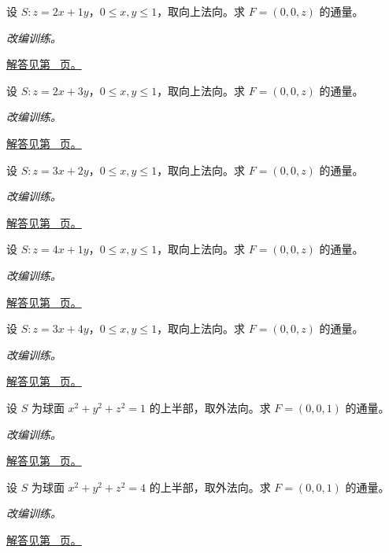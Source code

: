 \documentclass[12pt,fontset=fandol]{ctexart}
\begin{document}
\begin{example}[平面片的向上通量]\label{ex:c42q8}
设 $S:z=2x+1y$，$0\le x,y\le1$，取向上法向。求 $F=(0,0,z)$ 的通量。
\par\textit{改编训练。}\par\hyperref[ans:c42q8]{解答见第~\pageref{ans:c42q8} 页。}
\end{example}
\begin{example}[平面片的向上通量]\label{ex:c42q9}
设 $S:z=2x+3y$，$0\le x,y\le1$，取向上法向。求 $F=(0,0,z)$ 的通量。
\par\textit{改编训练。}\par\hyperref[ans:c42q9]{解答见第~\pageref{ans:c42q9} 页。}
\end{example}
\begin{example}[平面片的向上通量]\label{ex:c42q10}
设 $S:z=3x+2y$，$0\le x,y\le1$，取向上法向。求 $F=(0,0,z)$ 的通量。
\par\textit{改编训练。}\par\hyperref[ans:c42q10]{解答见第~\pageref{ans:c42q10} 页。}
\end{example}
\begin{example}[平面片的向上通量]\label{ex:c42q11}
设 $S:z=4x+1y$，$0\le x,y\le1$，取向上法向。求 $F=(0,0,z)$ 的通量。
\par\textit{改编训练。}\par\hyperref[ans:c42q11]{解答见第~\pageref{ans:c42q11} 页。}
\end{example}
\begin{example}[平面片的向上通量]\label{ex:c42q12}
设 $S:z=3x+4y$，$0\le x,y\le1$，取向上法向。求 $F=(0,0,z)$ 的通量。
\par\textit{改编训练。}\par\hyperref[ans:c42q12]{解答见第~\pageref{ans:c42q12} 页。}
\end{example}
\begin{example}[上半球上的常向量通量]\label{ex:c42q13}
设 $S$ 为球面 $x^2+y^2+z^2=1$ 的上半部，取外法向。求 $F=(0,0,1)$ 的通量。
\par\textit{改编训练。}\par\hyperref[ans:c42q13]{解答见第~\pageref{ans:c42q13} 页。}
\end{example}
\begin{example}[上半球上的常向量通量]\label{ex:c42q14}
设 $S$ 为球面 $x^2+y^2+z^2=4$ 的上半部，取外法向。求 $F=(0,0,1)$ 的通量。
\par\textit{改编训练。}\par\hyperref[ans:c42q14]{解答见第~\pageref{ans:c42q14} 页。}
\end{example}
\end{document}

